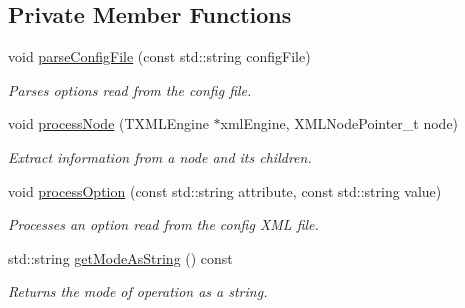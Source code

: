 \subsection*{Private Member Functions}
\begin{DoxyCompactItemize}
\item 
void \hyperlink{class_config_a3092a6e3ba0458b6bedca09f841f554e}{parse\+Config\+File} (const std\+::string config\+File)
\begin{DoxyCompactList}\small\item\em Parses options read from the config file. \end{DoxyCompactList}\item 
void \hyperlink{class_config_a46d81f90a7b6218385e8bfd0a283f6ce}{process\+Node} (T\+X\+M\+L\+Engine $\ast$xml\+Engine, X\+M\+L\+Node\+Pointer\+\_\+t node)
\begin{DoxyCompactList}\small\item\em Extract information from a node and its children. \end{DoxyCompactList}\item 
void \hyperlink{class_config_a42e48f8b6446cdc46badd09f6446a328}{process\+Option} (const std\+::string attribute, const std\+::string value)
\begin{DoxyCompactList}\small\item\em Processes an option read from the config X\+ML file. \end{DoxyCompactList}\item 
std\+::string \hyperlink{class_config_a3bd48a0ae54bfd982c02564160d6762b}{get\+Mode\+As\+String} () const
\begin{DoxyCompactList}\small\item\em Returns the mode of operation as a string. \end{DoxyCompactList}\end{DoxyCompactItemize}
